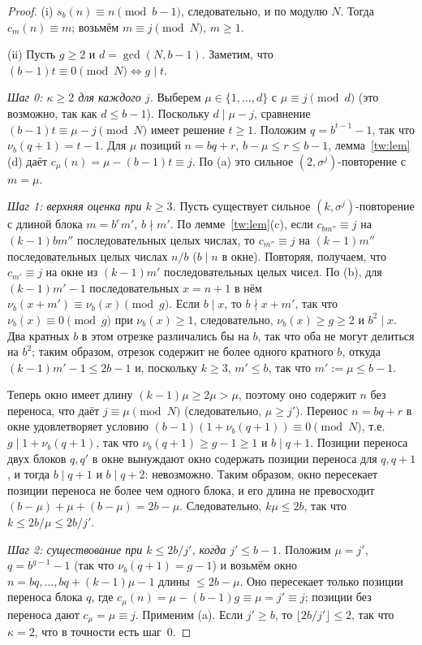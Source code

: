 \documentclass[a4paper,14pt]{extreport}
\theoremstyle{plain}
\theoremstyle{definition}
\theoremstyle{remark}
\begin{document}
\begin{proof}
	(i) $s_b(n)\equiv n\pmod{b-1}$, следовательно, и по модулю $N$. Тогда $c_m(n)\equiv m$; возьмём $m\equiv j\pmod N$, $m\ge1$.
	
	(ii) Пусть $g\ge2$ и $d=\gcd(N,b-1)$. Заметим, что $(b-1)t\equiv0\pmod N\iff g\mid t$.
	
	\emph{Шаг 0: $\kappa\ge2$ для каждого $j$.} Выберем $\mu\in\{1,\dots,d\}$ с $\mu\equiv j\pmod d$
	(это возможно, так как $d\le b-1$). Поскольку $d\mid\mu-j$, сравнение $(b-1)t\equiv\mu-j\pmod N$ имеет решение
	$t\ge1$. Положим $q=b^{t-1}-1$, так что $\nu_b(q+1)=t-1$. Для $\mu$ позиций $n=bq+r$, $b-\mu\le r\le b-1$,
	лемма~\ref{tw:lem}(d) даёт $c_\mu(n)=\mu-(b-1)t\equiv j$. По (a) это сильное $(2,\sigma^j)$-повторение с $m=\mu$.
	
	\emph{Шаг 1: верхняя оценка при $k\ge3$.} Пусть существует сильное $(k,\sigma^j)$-повторение с длиной блока $m=b^em'$, $b\nmid m'$.
	По лемме~\ref{tw:lem}(c), если $c_{bm''}\equiv j$ на $(k-1)bm''$ последовательных целых числах, то
	$c_{m''}\equiv j$ на $(k-1)m''$ последовательных целых числах $n/b$ ($b\mid n$ в окне).
	Повторяя, получаем, что $c_{m'}\equiv j$ на окне из $(k-1)m'$ последовательных целых чисел.
	По (b), для $(k-1)m'-1$ последовательных $x=n+1$ в нём $\nu_b(x+m')\equiv\nu_b(x)\pmod g$. Если $b\mid x$, то $b\nmid x+m'$,
	так что $\nu_b(x)\equiv0\pmod g$ при $\nu_b(x)\ge1$, следовательно, $\nu_b(x)\ge g\ge2$ и $b^2\mid x$.
	Два кратных $b$ в этом отрезке различались бы на $b$, так что оба не могут делиться на $b^2$; таким образом, отрезок
	содержит не более одного кратного $b$, откуда $(k-1)m'-1\le 2b-1$ и, поскольку $k\ge3$, $m'\le b$, так что $m':=\mu\le b-1$.
	
	Теперь окно имеет длину $(k-1)\mu\ge2\mu>\mu$, поэтому оно содержит $n$ без переноса, что даёт $j\equiv\mu\pmod N$
	(следовательно, $\mu\ge j'$). Перенос $n=bq+r$ в окне удовлетворяет условию
	$(b-1)(1+\nu_b(q+1))\equiv0\pmod N$, т.е.\ $g\mid 1+\nu_b(q+1)$, так что $\nu_b(q+1)\ge g-1\ge1$ и $b\mid q+1$.
	Позиции переноса двух блоков $q,q'$ в окне вынуждают окно содержать позиции переноса для $q,q+1$,
	и тогда $b\mid q+1$ и $b\mid q+2$: невозможно. Таким образом, окно пересекает позиции переноса не более чем одного блока, и его длина
	не превосходит $(b-\mu)+\mu+(b-\mu)=2b-\mu$. Следовательно, $k\mu\le2b$, так что $k\le 2b/\mu\le 2b/j'$.
	
	\emph{Шаг 2: существование при $k\le 2b/j'$, когда $j'\le b-1$.} Положим $\mu=j'$, $q=b^{g-1}-1$ (так что $\nu_b(q+1)=g-1$)
	и возьмём окно $n=bq,\dots,bq+(k-1)\mu-1$ длины $\le2b-\mu$.
	Оно пересекает только позиции переноса блока $q$, где
	$c_\mu(n)=\mu-(b-1)g\equiv\mu=j'\equiv j$; позиции без переноса дают $c_\mu=\mu\equiv j$. Применим (a).
	Если $j'\ge b$, то $\lfloor 2b/j'\rfloor\le2$, так что $\kappa=2$, что в точности есть шаг~0.
\end{proof}
\end{document}
